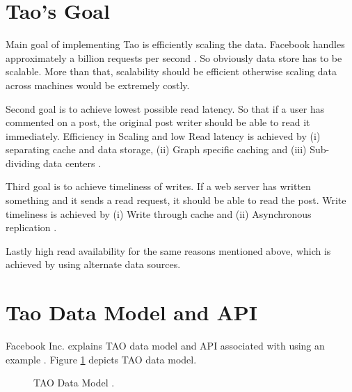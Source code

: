 \documentclass[9pt,twocolumn,twoside]{../../styles/osajnl}
\begin{document}
\section{Tao's Goal}
Main goal of implementing Tao is efficiently scaling the data. Facebook handles approximately a billion requests per second \cite{www-tao4}. So obviously data store has to be scalable. More than that, scalability should be efficient otherwise scaling data across machines would be extremely costly. 

Second goal is to achieve lowest possible read latency. So that if a user has commented on a post, the original post writer should be able to read it immediately.
Efficiency in Scaling and low Read latency is achieved by (i) separating cache and data storage, (ii) Graph specific caching and (iii) Sub-dividing data centers \cite{www-tao4}.

Third goal is to achieve timeliness of writes. If a web server has written something and it sends a read request, it should be able to read the post. Write timeliness is achieved by (i) Write through cache and (ii) Asynchronous replication \cite{www-tao4}.

Lastly high read availability for the same reasons mentioned above, which is achieved by using alternate data sources.

\section{Tao Data Model and API}
Facebook Inc. explains TAO data model and API associated with using an example \cite{www-tao2}. Figure \ref{fig:figure1} depicts TAO data model.

\begin{figure}[htbp]
\centering
{}
\caption{TAO Data Model \cite{www-tao2}.}
\label{fig:figure1}
\end{figure}
\end{document}
